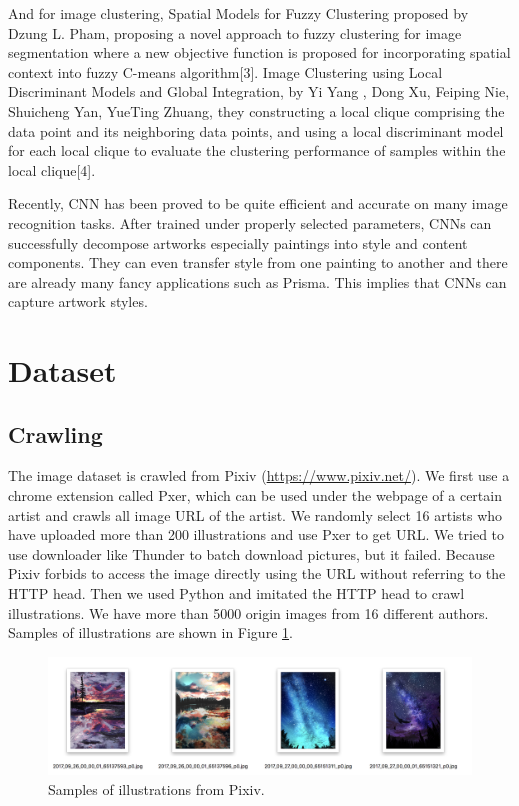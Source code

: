\documentclass{article}
\begin{document}
And for image clustering, Spatial Models for Fuzzy Clustering proposed by Dzung L. Pham, proposing a novel approach to fuzzy clustering for image segmentation where a new objective function is proposed for incorporating spatial context into fuzzy C-means algorithm[3]. Image Clustering using Local Discriminant Models and Global Integration, by Yi Yang , Dong Xu, Feiping Nie, Shuicheng Yan, YueTing Zhuang, they constructing a local clique comprising the data point and its neighboring data points, and using a local discriminant model for each local clique to evaluate the clustering performance of samples within the local clique[4]. 

Recently, CNN has been proved to be quite efficient and accurate on many image recognition tasks. After trained under properly selected parameters, CNNs can successfully decompose artworks especially paintings into style and content components. They can even transfer style from one painting to another and there are already many fancy applications such as Prisma. This implies that CNNs can capture artwork styles.

\section{Dataset}
\subsection{Crawling}
The image dataset is crawled from Pixiv (\url{https://www.pixiv.net/}). We first use a chrome extension called Pxer, which can be used under the webpage of a certain artist and crawls all image URL of the artist. We randomly select 16 artists who have uploaded more than 200 illustrations and use Pxer to get URL. We tried to use downloader like Thunder to batch download pictures, but it failed. Because Pixiv forbids to access the image directly using the URL without referring to the HTTP head. Then we used Python and imitated the HTTP head to crawl illustrations. We have more than 5000 origin images from 16 different authors. Samples of illustrations are shown in Figure \ref{pixiv_sample}.

\begin{figure}[ht]
  \centering
  \includegraphics[width=0.94\linewidth]{pixiv_sample.png}
  \caption{Samples of illustrations from Pixiv.}
  \label{pixiv_sample}
\end{figure}
\end{document}
